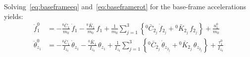 Solving~\eqref{eq:baseframeeq} and~\eqref{eq:baseframerot} for the base-frame accelerations yields:
\begin{align}
    \ddot{f}^{0}_{1}
    &= -\frac{{}^0\bar{C}_1}{m_0}\,\dot{f}_1
       -\frac{{}^0\bar{K}_1}{m_0}\,f_1
       +\frac{1}{m_0}\sum_{j=1}^{3}\left\{
           {}^0\bar{C}_{2_j}\,\dot{f}_{2_j} + {}^0\bar{K}_{2_j}\,f_{2_j}
       \right\}
       +\frac{u^0_{1}}{m_0} \label{eq:f1ddot} \\[4pt]
    \ddot{\theta}^{0}_{z_1}
    &= -\frac{{}^0\bar{C}_1}{I_{z_0}}\,\dot{\theta}_{z_1}
       -\frac{{}^0\bar{K}_1}{I_{z_0}}\,\theta_{z_1}
       +\frac{1}{I_{z_0}}\sum_{j=1}^{3}\left\{
           {}^0\bar{C}_{2_j}\,\dot{\theta}_{z_{2_j}} + {}^0\bar{K}_{2_j}\,\theta_{z_{2_j}}
       \right\}
       +\frac{\tau^0_{1}}{I_{z_0}} \label{eq:th1ddot}
\end{align}

